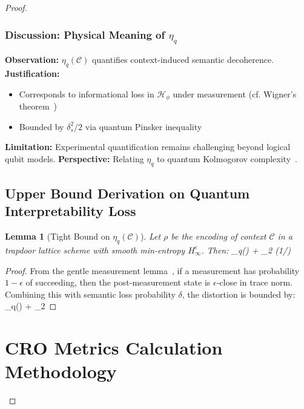 \documentclass[preprint,12pt]{elsarticle}
\newtheorem{lemma}{Lemma}[section]
\begin{document}
\begin{proof}
                \subsubsection{Discussion: Physical Meaning of $\eta_q$}  
                    \textbf{Observation:} $\eta_q(\mathcal{C})$ quantifies context-induced semantic decoherence.  
                    \textbf{Justification:}  
                    \begin{itemize} 
                        \item Corresponds to informational loss in $\mathcal{H}_\phi$ under measurement (cf. Wigner's theorem~\cite{Wigner1963})  
                        \item Bounded by $\delta_s^2/2$ via quantum Pinsker inequality~\cite{Wilming2018}  
                    \end{itemize}
                    \textbf{Limitation:} Experimental quantification remains challenging beyond logical qubit models.  
                    \textbf{Perspective:} Relating $\eta_q$ to quantum Kolmogorov complexity~\cite{Berthiaume1997}.

            \subsection{Upper Bound Derivation on Quantum Interpretability Loss}\label{app:B.5_upper_boudb_deriv_qt_interp}%
                \begin{lemma}[Tight Bound on $\eta_q(\mathcal{C})$] \label{lem:tight_quantum_bound} 
                    Let $\rho$ be the encoding of context $\mathcal{C}$ in a trapdoor lattice scheme with smooth min-entropy $H_\infty^{\epsilon}$. Then:
                    \eta_q() \leq \epsilon + \log_2 (1/\delta)
                \end{lemma}
                \begin{proof}\label{pr:tight_quantum_bound}  
                    From the gentle measurement lemma~\cite{Wilde2017}, if a measurement has probability $1-\epsilon$ of succeeding, then the post-measurement state is $\epsilon$-close in trace norm. Combining this with semantic loss probability $\delta$, the distortion is bounded by:
                    \eta_q() \leq \epsilon + \log_2 
                \end{proof}
        \section{CRO Metrics Calculation Methodology}\label{app:Appendix_C}

\end{proof}
\end{document}
